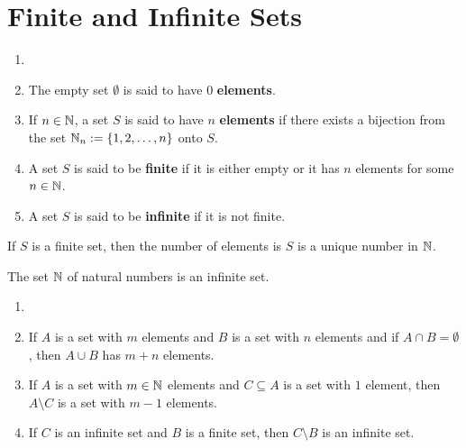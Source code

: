 \section{Finite and Infinite Sets}

\begin{definition}
	\begin{enumerate}
		\item[]
		\item The empty set $\emptyset$ is said to have $0$ \textbf{elements}.

		\item If $n \in \mathbb{N}$, a set $S$ is said to have $n$ \textbf{elements} if there exists a bijection from the set $\mathbb{N}_n := \{1, 2, \dots, n\}$ onto $S$.

		\item A set $S$ is said to be \textbf{finite} if it is either empty or it has $n$ elements for some $n \in \mathbb{N}$.

		\item A set $S$ is said to be \textbf{infinite} if it is not finite.
	\end{enumerate}
\end{definition}

\begin{theorem}
	If $S$ is a finite set, then the number of elements is $S$ is a unique number in $\mathbb{N}$.
\end{theorem}

\begin{theorem}
	The set $\mathbb{N}$ of natural numbers is an infinite set.
\end{theorem}

\begin{theorem}
	\begin{enumerate}
		\item[]
		\item If $A$ is a set with $m$ elements and $B$ is a set with $n$ elements and if $A \cap B = \emptyset$, then $A \cup B$ has $m +n$ elements.

		\item If $A$ is a set with $m \in \mathbb{N}$ elements and $C \subseteq A$ is a set with $1$ element, then $A \setminus C$ is a set with $m-1$ elements.

		\item If $C$ is an infinite set and $B$ is a finite set, then $C \setminus B$ is an infinite set.
	\end{enumerate}
\end{theorem}

